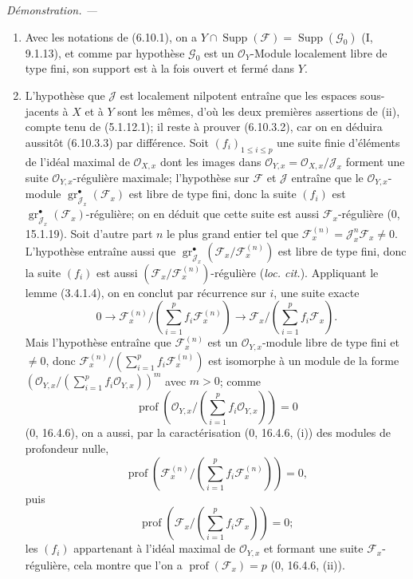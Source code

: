 \documentclass[10pt,oneside]{book}
\newcommand{\oldpage}[2][]{%
  \setcounter{footnote}{0}%
  \marginpar{\scriptsize\textbf{#1}~|~#2}\ignorespaces}
\newenvironment{proof}{%
  \par\medskip\noindent\textit{Démonstration. ---\ }}{\par}
\begin{document}
\begin{proof}
\begin{enumerate}
\item[(i)] Avec les notations de (6.10.1), on a
$Y\cap\operatorname{Supp}(\mathcal F)=\operatorname{Supp}(\mathcal G_0)$
(I, 9.1.13), et comme par hypothèse $\mathcal G_0$ est un
$\mathcal O_Y$-Module localement libre de type fini, son support est à la fois
ouvert et fermé dans $Y$.

\oldpage[IV-2]{156}

\item[(ii)] L'hypothèse que $\mathcal J$ est localement nilpotent entraîne que
les espaces sous-jacents à $X$ et à $Y$ sont les mêmes, d'où les deux premières
assertions de (ii), compte tenu de (5.1.12.1); il reste à prouver (6.10.3.2),
car on en déduira aussitôt (6.10.3.3) par différence. Soit
$(f_i)_{1\leq i\leq p}$ une suite finie d'éléments de l'idéal maximal de
$\mathcal O_{X,x}$ dont les images dans
$\mathcal O_{Y,x}=\mathcal O_{X,x}/\mathcal J_x$ forment une suite
$\mathcal O_{Y,x}$-régulière maximale; l'hypothèse sur $\mathcal F$ et
$\mathcal J$ entraîne que le $\mathcal O_{Y,x}$-module
$\operatorname{gr}_{\mathcal J_x}^{\bullet}(\mathcal F_x)$ est libre de type
fini, donc la suite $(f_i)$ est
$\operatorname{gr}_{\mathcal J_x}^{\bullet}(\mathcal F_x)$-régulière; on en
déduit que cette suite est aussi $\mathcal F_x$-régulière (0, 15.1.19). Soit
d'autre part $n$ le plus grand entier tel que
$\mathcal F_x^{(n)}=\mathcal J_x^n\mathcal F_x\ne0$. L'hypothèse entraîne
aussi que
$\operatorname{gr}_{\mathcal J_x}^{\bullet}
(\mathcal F_x/\mathcal F_x^{(n)})$ est libre de type fini, donc la suite
$(f_i)$ est aussi $(\mathcal F_x/\mathcal F_x^{(n)})$-régulière
(\emph{loc. cit.}). Appliquant le lemme (3.4.1.4), on en conclut par récurrence
sur $i$, une suite exacte
\[
0\longrightarrow
\mathcal F_x^{(n)}/\left(\sum_{i=1}^{p}f_i\mathcal F_x^{(n)}\right)
\longrightarrow
\mathcal F_x/\left(\sum_{i=1}^{p}f_i\mathcal F_x\right).
\]
Mais l'hypothèse entraîne que $\mathcal F_x^{(n)}$ est un
$\mathcal O_{Y,x}$-module libre de type fini et $\ne0$, donc
$\mathcal F_x^{(n)}/(\sum_{i=1}^{p}f_i\mathcal F_x^{(n)})$ est isomorphe à
un module de la forme
$(\mathcal O_{Y,x}/(\sum_{i=1}^{p}f_i\mathcal O_{Y,x}))^m$ avec $m>0$; comme
\[
\operatorname{prof}\left(\mathcal O_{Y,x}/
\left(\sum_{i=1}^{p}f_i\mathcal O_{Y,x}\right)\right)=0
\]
(0, 16.4.6), on a aussi, par la caractérisation (0, 16.4.6, (i)) des modules
de profondeur nulle,
\[
\operatorname{prof}\left(\mathcal F_x^{(n)}/
\left(\sum_{i=1}^{p}f_i\mathcal F_x^{(n)}\right)\right)=0,
\]
puis
\[
\operatorname{prof}\left(\mathcal F_x/
\left(\sum_{i=1}^{p}f_i\mathcal F_x\right)\right)=0;
\]
les $(f_i)$ appartenant à l'idéal maximal de $\mathcal O_{Y,x}$ et formant
une suite $\mathcal F_x$-régulière, cela montre que l'on a
$\operatorname{prof}(\mathcal F_x)=p$ (0, 16.4.6, (ii)).
\end{enumerate}
\end{proof}
\end{document}
